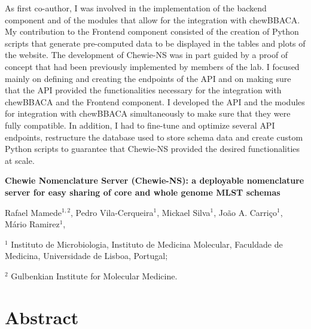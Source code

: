 As first co-author, I was involved in the implementation of the backend component and of the modules that allow for the integration with chewBBACA. My contribution to the Frontend component consisted of the creation of Python scripts that generate pre-computed data to be displayed in the tables and plots of the website. The development of \ac{Chewie-NS} was in part guided by a proof of concept that had been previously implemented by members of the lab. I focused mainly on defining and creating the endpoints of the \ac{API} and on making sure that the \ac{API} provided the functionalities necessary for the integration with chewBBACA and the Frontend component. I developed the \ac{API} and the modules for integration with chewBBACA simultaneously to make sure that they were fully compatible. In addition, I had to fine-tune and optimize several \ac{API} endpoints, restructure the database used to store schema data and create custom Python scripts to guarantee that \ac{Chewie-NS} provided the desired functionalities at scale.

\newpage

\begin{center}
\large
\textbf{Chewie Nomenclature Server (Chewie-NS): a deployable nomenclature server for easy sharing of core and whole genome MLST schemas}
\end{center}

Rafael Mamede$^{1,2}$, 
Pedro Vila-Cerqueira$^1$, 
Mickael Silva$^1$,
João A. Carriço$^1$,
Mário Ramirez$^1$,

$^1$ Instituto de Microbiologia, Instituto de Medicina Molecular, Faculdade de Medicina, Universidade de Lisboa, Portugal;

$^2$ Gulbenkian Institute for Molecular Medicine.

\section{Abstract} \label{sec:ch3_abstract}

